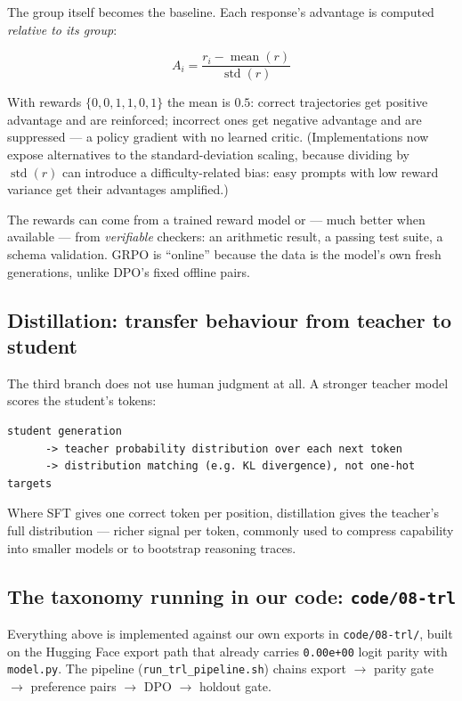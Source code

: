 The group itself becomes the baseline. Each response's advantage is
computed \emph{relative to its group}:

\[
  A_i = \frac{r_i - \operatorname{mean}(r)}{\operatorname{std}(r)}
\]

With rewards $\{0,0,1,1,0,1\}$ the mean is $0.5$: correct trajectories get
positive advantage and are reinforced; incorrect ones get negative
advantage and are suppressed --- a policy gradient with no learned critic.
(Implementations now expose alternatives to the standard-deviation
scaling, because dividing by $\operatorname{std}(r)$ can introduce a
difficulty-related bias: easy prompts with low reward variance get their
advantages amplified.)

The rewards can come from a trained reward model or --- much better when
available --- from \emph{verifiable} checkers: an arithmetic result, a
passing test suite, a schema validation. GRPO is ``online'' because the
data is the model's own fresh generations, unlike DPO's fixed offline
pairs.

\subsection{Distillation: transfer behaviour from teacher to student}

The third branch does not use human judgment at all. A stronger teacher
model scores the student's tokens:

\begin{lstlisting}[language={},basicstyle=\small\ttfamily]
student generation
      -> teacher probability distribution over each next token
      -> distribution matching (e.g. KL divergence), not one-hot targets
\end{lstlisting}

Where SFT gives one correct token per position, distillation gives the
teacher's full distribution --- richer signal per token, commonly used to
compress capability into smaller models or to bootstrap reasoning traces.

\subsection{The taxonomy running in our code: \texttt{code/08-trl}}

Everything above is implemented against our own exports in
\texttt{code/08-trl/}, built on the Hugging Face export path that already
carries \texttt{0.00e+00} logit parity with \texttt{model.py}. The pipeline
(\texttt{run\_trl\_pipeline.sh}) chains export $\to$ parity gate $\to$
preference pairs $\to$ DPO $\to$ holdout gate.

